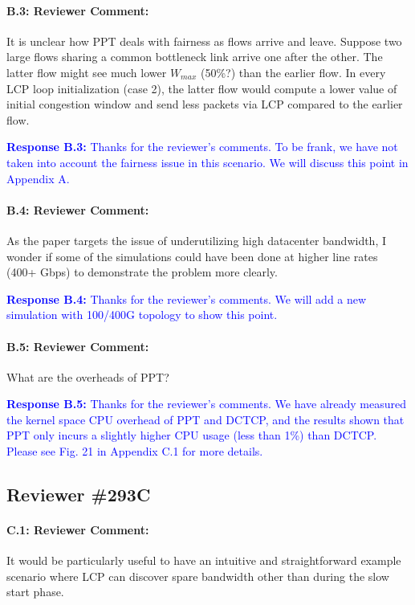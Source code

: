 \documentclass[12pt,one-column]{article}
\begin{document}
{\it \paragraph{B.3: Reviewer Comment:} It is unclear how PPT deals with fairness as flows arrive and leave. Suppose two large flows sharing a common bottleneck link arrive one after the other. The latter flow might see much lower $W_{max}$ (50\%?) than the earlier flow. In every LCP loop initialization (case 2), the latter flow would compute a lower value of initial congestion window and send less packets via LCP compared to the earlier flow.}


\noindent\textcolor{blue}{\textbf{Response B.3:}
Thanks for the reviewer’s comments. 
To be frank, we have not taken into account the fairness issue in this scenario.
We will discuss this point in Appendix A.
}

{\it \paragraph{B.4: Reviewer Comment:} As the paper targets the issue of underutilizing high datacenter bandwidth, I wonder if some of the simulations could have been done at higher line rates (400+ Gbps) to demonstrate the problem more clearly.}


\noindent\textcolor{blue}{\textbf{Response B.4:}
Thanks for the reviewer’s comments. 
We will add a new simulation with 100/400G topology to show this point.
}

{\it \paragraph{B.5: Reviewer Comment:} What are the overheads of PPT?}

\noindent\textcolor{blue}{\textbf{Response B.5:}
Thanks for the reviewer’s comments. 
We have already measured the kernel space CPU overhead of PPT and DCTCP, and the results shown that PPT only incurs a slightly higher CPU usage (less than 1\%) than DCTCP. 
Please see Fig. 21 in Appendix C.1 for more details.
}

\subsection{Reviewer \#293C}
{\it \paragraph{C.1: Reviewer Comment:} It would be particularly useful to have an intuitive and straightforward example scenario where LCP can discover spare bandwidth other than during the slow start phase.}
\end{document}
